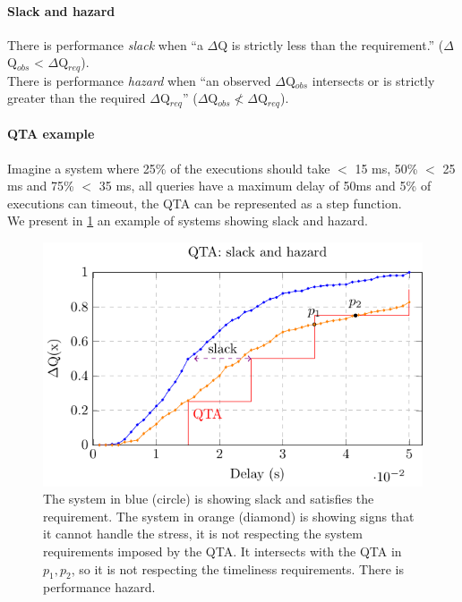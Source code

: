     \paragraph{Slack and hazard} There is performance \textit{slack} when ``a $\Delta$Q is strictly less than the requirement.'' ($\Delta$Q$_{obs}$ < $\Delta$Q$_{req}$). \\
    There is performance \textit{hazard} when ``an observed $\Delta$Q$_{obs}$ intersects or is strictly greater than the required $\Delta$Q$_{req}$'' ($\Delta$Q$_{obs} \nless \Delta$Q$_{req}$). \cite{myo}
 
    \paragraph{QTA example} Imagine a system where 25\% of the executions should take $<$ 15 ms, 50\% $<$ 25 ms and 75\% $<$ 35 ms, all queries have a maximum delay of 50ms and 5\% of executions can timeout, the QTA can be represented as a step function. \\
    We present in \cref{fig:qta_step} an example of systems showing slack and hazard.
        \begin{figure}[H]
            \begin{center}
                \includegraphics[scale=1.2]{tikz/cdf_qta_slack.pdf}
            \end{center}
            \caption{The system in blue (circle) is showing slack and satisfies the requirement. The system in orange (diamond) is showing signs that it cannot handle the stress, it is not respecting the system requirements imposed by the QTA. It intersects with the QTA in $p_1, p_2$, so it is not respecting the timeliness requirements. There is performance hazard.}%
            \label{fig:qta_step}
        \end{figure}

